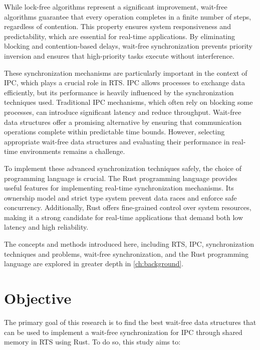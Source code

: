 While lock-free algorithms represent a significant improvement, wait-free algorithms guarantee that every operation completes in a finite number of steps, regardless of contention. This property ensures system responsiveness and predictability, which are essential for real-time applications. By eliminating blocking and contention-based delays, wait-free synchronization prevents priority inversion and ensures that high-priority tasks execute without interference. \cite{kogan2012methodology, herlihy1991wait, brandenburg2019multiprocessorrealtimelockingprotocols}

These synchronization mechanisms are particularly important in the context of \ac{IPC}, which plays a crucial role in \ac{RTS}. \ac{IPC} allows processes to exchange data efficiently, but its performance is heavily influenced by the synchronization techniques used. Traditional \ac{IPC} mechanisms, which often rely on blocking some processes, can introduce significant latency and reduce throughput. Wait-free data structures offer a promising alternative by ensuring that communication operations complete within predictable time bounds. However, selecting appropriate wait-free data structures and evaluating their performance in real-time environments remains a challenge. \cite{timnat2014practical, michael1996simple, huang2002improvingWaitFree, pellegrini2020relevancewaitfreecoordinationalgorithms}

To implement these advanced synchronization techniques safely, the choice of programming language is crucial. The Rust programming language provides useful features for implementing real-time synchronization mechanisms. Its ownership model and strict type system prevent data races and enforce safe concurrency. Additionally, Rust offers fine-grained control over system resources, making it a strong candidate for real-time applications that demand both low latency and high reliability. \cite{xu2023rust, sharma2024rustembeddedsystemscurrent}

The concepts and methods introduced here, including \ac{RTS}, \ac{IPC}, synchronization techniques and problems, wait-free synchronization, and the Rust programming language are explored in greater depth in \cref{ch:background}. 

\section{Objective}\label{sec:objective}

The primary goal of this research is to find the best wait-free data structures that can be used to implement a wait-free synchronization for \ac{IPC} through shared memory in \ac{RTS} using Rust. To do so, this study aims to:

